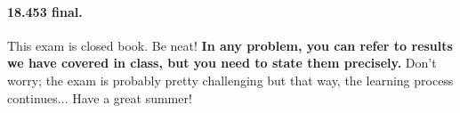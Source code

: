 \documentclass[12pt]{article}
\begin{document}

\paragraph{18.453 final.} This exam is closed book.  Be neat!  {\bf In any problem, you can refer to results we have covered in class, but you need to state them precisely. } 
Don't worry; the exam is probably pretty challenging but that way, the learning process continues... Have a great summer! 
 \vspace*{0.1in}


\end{document}
